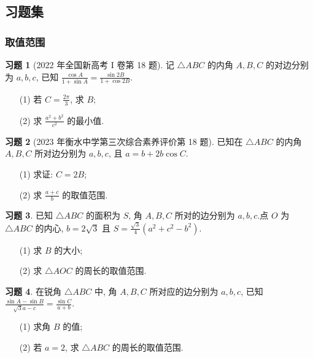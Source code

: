 \documentclass[12pt,a4paper]{ctexbook}
\theoremstyle{definition}
\newtheorem{exercise}{习题}
\theoremstyle{remark}
\begin{document}
	\subsection{习题集}
	\subsubsection{取值范围}
	\begin{exercise}[2022 年全国新高考 I 卷第 18 题]\label{ex:gaokao2022_18}
		记 $\triangle ABC$ 的内角 $A,B,C$ 的对边分别为 $a,b,c$, 已知 $\frac{\cos A}{1+\sin A} = \frac{\sin 2B}{1+\cos 2B}$.
		\begin{enumerate}
			\item[(1)] 若 $C = \frac{2\pi}{3}$, 求 $B$;
			\item[(2)] 求 $\frac{a^2+b^2}{c^2}$ 的最小值.
		\end{enumerate}
	\end{exercise}
	
	\begin{exercise}[2023 年衡水中学第三次综合素养评价第 18 题]\label{ex:hengshui2023_18}
		已知在 $\triangle ABC$ 的内角 $A,B,C$ 所对边分别为 $a,b,c$, 且 $a=b+2b\cos C$.
		\begin{enumerate}
			\item[(1)] 求证: $C=2B$;
			\item[(2)] 求 $\frac{a+c}{b}$ 的取值范围.
		\end{enumerate}
	\end{exercise}
	
	\begin{exercise}\label{ex:incenter_area}
		已知 $\triangle ABC$ 的面积为 $S$, 角 $A,B,C$ 所对的边分别为 $a,b,c$.点 $O$ 为 $\triangle ABC$ 的内心, $b = 2\sqrt{3}$ 且 $S = \frac{\sqrt{3}}{4}(a^2+c^2-b^2)$.
		\begin{enumerate}
			\item[(1)] 求 $B$ 的大小;
			\item[(2)] 求 $\triangle AOC$ 的周长的取值范围.
		\end{enumerate}
	\end{exercise}
	
	\begin{exercise}\label{ex:acute_triangle_perimeter}
		在锐角 $\triangle ABC$ 中, 角 $A, B, C$ 所对应的边分别为 $a, b, c$, 已知 $\frac{\sin A - \sin B}{\sqrt{3}a - c} = \frac{\sin C}{a+b}$.
		\begin{enumerate}
			\item[(1)] 求角 $B$ 的值;
			\item[(2)] 若 $a=2$, 求 $\triangle ABC$ 的周长的取值范围.
		\end{enumerate}
	\end{exercise}
	
\end{document}
